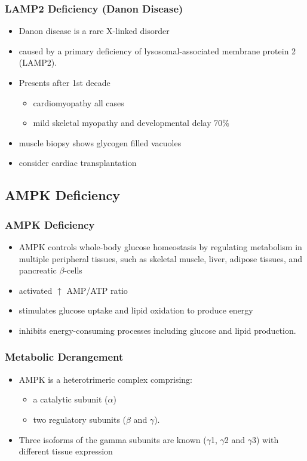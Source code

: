 \documentclass{scrartcl}
\begin{document}
\subsubsection{LAMP2 Deficiency (Danon Disease)}
\label{sec:org5177b21}
\begin{itemize}
\item Danon disease is a rare X-linked disorder
\item caused by a primary deficiency of lysosomal-associated membrane
protein 2 (LAMP2).
\item Presents after 1st decade
\begin{itemize}
\item cardiomyopathy all cases
\item mild skeletal myopathy and developmental delay 70\%
\end{itemize}
\item muscle biopsy shows glycogen filled vacuoles
\item consider cardiac transplantation
\end{itemize}

\subsection{AMPK Deficiency}
\label{sec:org5a620fc}
\subsubsection{AMPK Deficiency}
\label{sec:org02bcde4}
\begin{itemize}
\item AMPK controls whole-body glucose homeostasis by regulating metabolism in multiple peripheral tissues, such as
skeletal muscle, liver, adipose tissues, and pancreatic \(\beta\)-cells
\item activated \(\uparrow\) AMP/ATP ratio
\item stimulates glucose uptake and lipid oxidation to produce energy
\item inhibits energy-consuming processes including glucose and lipid production.
\end{itemize}

\subsubsection{Metabolic Derangement}
\label{sec:orgaef227e}
\begin{itemize}
\item AMPK is a heterotrimeric complex comprising:
\begin{itemize}
\item a catalytic subunit (\(\alpha\))
\item two regulatory subunits (\(\beta\) and \(\gamma\)).
\end{itemize}
\item Three isoforms of the gamma subunits are known (\(\gamma\)1, \(\gamma\)2 and \(\gamma\)3) with different tissue
expression
\end{itemize}
\end{document}
